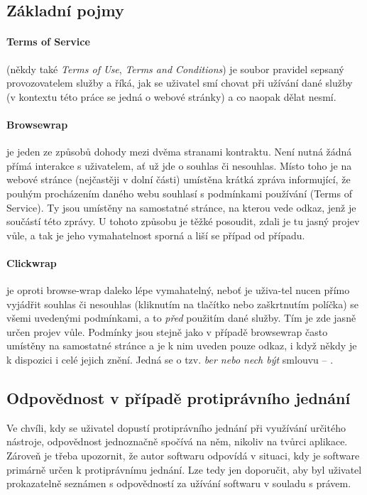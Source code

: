 \documentclass[thesis=B,czech]{FITthesis}[2012/06/26]
\begin{document}
\subsection{Základní pojmy}
\paragraph{Terms of Service} (někdy také \textit{Terms of Use}, \textit{Terms and Conditions}) je soubor pravidel sepsaný provozovatelem služby a říká, jak se uživatel smí chovat při užívání dané služby (v kontextu této práce se jedná o webové stránky) a co naopak dělat nesmí.

\paragraph{Browsewrap} je jeden ze způsobů dohody mezi dvěma stranami kontraktu. Není nutná žádná přímá interakce s uživatelem, ať už jde o souhlas či nesouhlas. Místo toho je na webové stránce (nejčastěji v dolní části) umístěna krátká zpráva informující, že pouhým procházením daného webu souhlasí s podmínkami používání (Terms of Service). Ty jsou umístěny na samostatné stránce, na kterou vede odkaz, jenž je součástí této zprávy. U tohoto způsobu je těžké posoudit, zdali je tu jasný projev vůle, a tak je jeho vymahatelnost sporná a liší se případ od případu.\cite{browse_wrap}

\paragraph{Clickwrap}\label{def:clickwrap} je oproti browse-wrap daleko lépe vymahatelný, neboť je uživa-tel nucen přímo vyjádřit souhlas či nesouhlas (kliknutím na tlačítko nebo zaškrtnutím políčka) se všemi uvedenými podmínkami, a to \emph{před} použitím dané služby. Tím je zde jasně určen projev vůle. Podmínky jsou stejně jako v případě browsewrap často umístěny na samostatné stránce a je k nim uveden pouze odkaz, i když někdy je k dispozici i celé jejich znění. Jedná se o tzv. \emph{ber nebo nech být} smlouvu -- \cite[překlad autora]{take_it_or_leave_it}.\cite{click_wrap}

\subsection{Odpovědnost v případě protiprávního jednání}
Ve chvíli, kdy se uživatel dopustí protiprávního jednání při využívání určitého nástroje, odpovědnost jednoznačně spočívá na něm, nikoliv na tvůrci aplikace. Zároveň je třeba upozornit, že autor softwaru odpovídá v situaci, kdy je software primárně určen k protiprávnímu jednání. Lze tedy jen doporučit, aby byl uživatel prokazatelně seznámen s odpovědností za užívání softwaru v souladu s právem.\cite{rozhovor}
\end{document}
